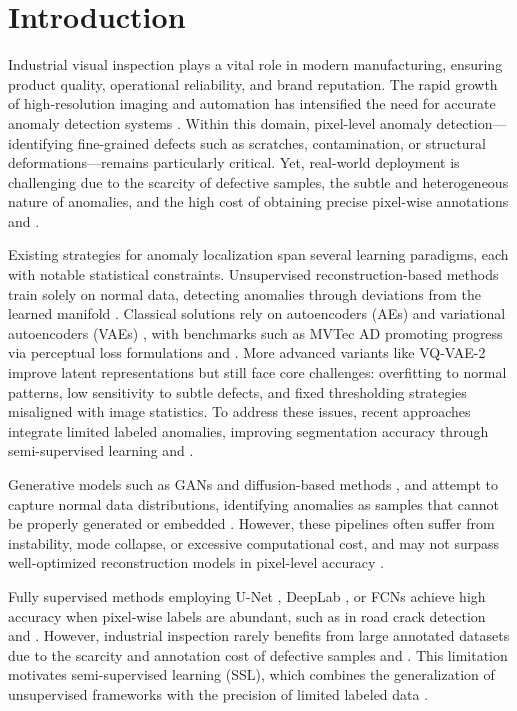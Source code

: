 \documentclass[twoside]{article}
\begin{document}
\section{Introduction}

Industrial visual inspection plays a vital role in modern manufacturing, ensuring product quality, operational reliability, and brand reputation. The rapid growth of high-resolution imaging and automation has intensified the need for accurate anomaly detection systems \cite{bergmann2019improving}. Within this domain, pixel-level anomaly detection—identifying fine-grained defects such as scratches, contamination, or structural deformations—remains particularly critical. Yet, real-world deployment is challenging due to the scarcity of defective samples, the subtle and heterogeneous nature of anomalies, and the high cost of obtaining precise pixel-wise annotations \cite{bergmann2021mvtec} and \cite{pimentel2014}.

Existing strategies for anomaly localization span several learning paradigms, each with notable statistical constraints. Unsupervised reconstruction-based methods train solely on normal data, detecting anomalies through deviations from the learned manifold \cite{pimentel2014}. Classical solutions rely on autoencoders (AEs) \cite{baur2018} and variational autoencoders (VAEs) \cite{goodfellow2014}, with benchmarks such as MVTec AD promoting progress via perceptual loss formulations \cite{bergmann2019improving} and \cite{bergmann2021mvtec}. More advanced variants like VQ-VAE-2 \cite{yapp2024} improve latent representations but still face core challenges: overfitting to normal patterns, low sensitivity to subtle defects, and fixed thresholding strategies misaligned with image statistics. To address these issues, recent approaches integrate limited labeled anomalies, improving segmentation accuracy through semi-supervised learning \cite{kang2026} and \cite{chu2020}.

Generative models such as GANs \cite{goodfellow2014} and diffusion-based methods \cite{dai2025}, \cite{sun2025} and \cite{rombach2022} attempt to capture normal data distributions, identifying anomalies as samples that cannot be properly generated or embedded \cite{schlegl2017}. However, these pipelines often suffer from instability, mode collapse, or excessive computational cost, and may not surpass well-optimized reconstruction models in pixel-level accuracy \cite{bergmann2021mvtec}.

Fully supervised methods employing U-Net \cite{ronneberger2015}, DeepLab \cite{long2017}, or FCNs \cite{chen2018} achieve high accuracy when pixel-wise labels are abundant, such as in road crack detection \cite{shi2016} and \cite{chen2018}. However, industrial inspection rarely benefits from large annotated datasets due to the scarcity and annotation cost of defective samples \cite{ronneberger2015} and \cite{shi2016}. This limitation motivates semi-supervised learning (SSL), which combines the generalization of unsupervised frameworks with the precision of limited labeled data \cite{kang2026}.
\end{document}
